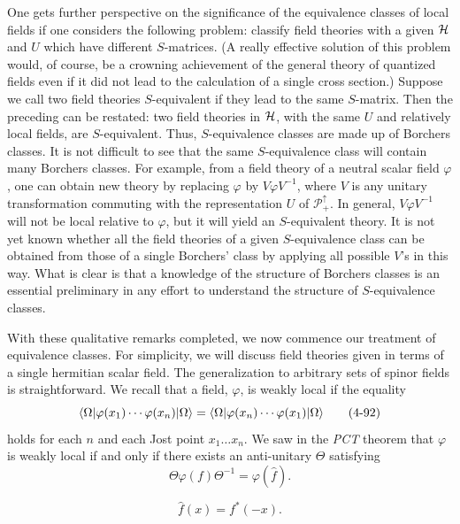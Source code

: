 One gets further perspective on the significance of the equivalence classes
of local fields if one considers the following problem: classify field
theories with a given $\mathcal{H}$ and $U$ which have different $S$-matrices.
(A really effective solution of this problem would, of course, be a crowning
achievement of the general theory of quantized fields even if it did not lead
to the calculation of a single cross section.) Suppose we call two field
theories $S$-equivalent if they lead to the same $S$-matrix. Then the
preceding can be restated: two field theories in $\mathcal{H}$, with the same $U$
and relatively local fields, are $S$-equivalent. Thus, $S$-equivalence classes
are made up of Borchers classes. It is not difficult to see that the same
$S$-equivalence class will contain many Borchers classes. For example, from a
field theory of a neutral scalar field $\varphi$, one can obtain new theory by
replacing $\varphi$ by $V\varphi V^{-1}$, where $V$ is any unitary
transformation commuting with the representation $U$ of
$\mathcal P_+^\uparrow$. In general, $V\varphi V^{-1}$ will not be local
relative to $\varphi$, but it will yield an $S$-equivalent theory. It is not
yet known whether all the field theories of a given $S$-equivalence class can
be obtained from those of a single Borchers' class by applying all possible
$V$'s in this way. What is clear is that a knowledge of the structure of
Borchers classes is an essential preliminary in any effort to understand the
structure of $S$-equivalence classes.

With these qualitative remarks completed, we now commence our treatment of
equivalence classes. For simplicity, we will discuss field theories given in
terms of a single hermitian scalar field. The generalization to arbitrary sets
of spinor fields is straightforward. We recall that a field, $\varphi$, is
weakly local if the equality
\begin{equation}
  \langle \Omega\rvert\varphi(x_1)\cdots\varphi(x_n)\lvert \Omega\rangle
  =
  \langle \Omega\rvert\varphi(x_n)\cdots\varphi(x_1)\lvert \Omega\rangle
  \tag{4-92}\label{eq:ch4-wlc}
\end{equation}
holds for each $n$ and each Jost point $x_1\ldots x_n$. We saw in the
\emph{PCT} theorem that $\varphi$ is weakly local if and only if there exists
an anti-unitary $\Theta$ satisfying
\begin{equation}
  \Theta\varphi(f)\Theta^{-1}=\varphi(\widehat f).
  \tag{4-93}\label{eq:ch4-wlc-pct}
\end{equation}

\begin{equation*}
  \widehat f(x)=f^*(-x).
\end{equation*}

